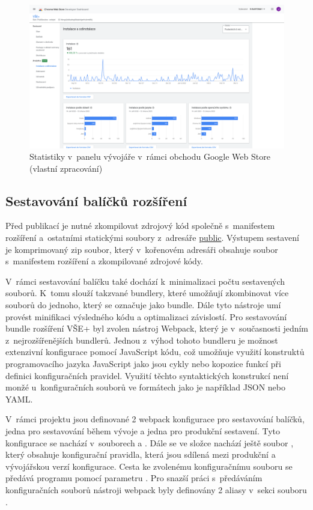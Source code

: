 \begin{figure}[htbp!]\centering
\includegraphics[width=\textwidth]{img/google-webstore-analytics.png}
\caption{Statistiky v~panelu vývojáře v~rámci obchodu Google Web Store (vlastní zpracování)}
\label{obr:google-webstore-analytics}
\end{figure}

\subsection{Sestavování balíčků rozšíření}

Před publikací je nutné zkompilovat zdrojový kód společně s~manifestem rozšíření a~ostatními statickými soubory z~adresáře \url{public}. Výstupem sestavení je komprimovaný zip soubor, který v~kořenovém adresáři obsahuje soubor s~manifestem rozšíření a zkompilované zdrojové kódy.

V~rámci sestavování balíčku také dochází k~minimalizaci počtu sestavených souborů. K~tomu slouží takzvané bundlery, které umožňují zkombinovat více souborů do jednoho, který se označuje jako bundle. Dále tyto nástroje umí provést minifikaci výsledného kódu a optimalizaci závislostí. Pro sestavování bundle rozšíření VŠE+ byl zvolen nástroj Webpack, který je v~současnosti jedním z~nejrozšířenějších bundlerů. Jednou z~výhod tohoto bundleru je možnost extenzivní konfigurace pomocí JavaScript kódu, což umožňuje využití konstruktů programovacího jazyka JavaScript jako jsou cykly nebo kopozice funkcí při definici konfiguračních pravidel. Využití těchto syntaktických konstrukcí není monžé u~konfiguračních souborů ve formátech jako je například JSON nebo YAML.

V~rámci projektu jsou definované 2 webpack konfigurace pro sestavování balíčků, jedna pro sestavování během vývoje a jedna pro produkční sestavení. Tyto konfigurace se nachází v~souborech  a . Dále se ve složce  nachází ještě soubor , který obsahuje konfigurační pravidla, která jsou sdílená mezi produkční a vývojářskou verzí konfigurace. Cesta ke zvolenému konfiguračnímu souboru se předává programu  pomocí parametru . Pro snazší práci s~předáváním konfiguračních souborů nástroji webpack byly definovány 2 aliasy v~sekci  souboru .

